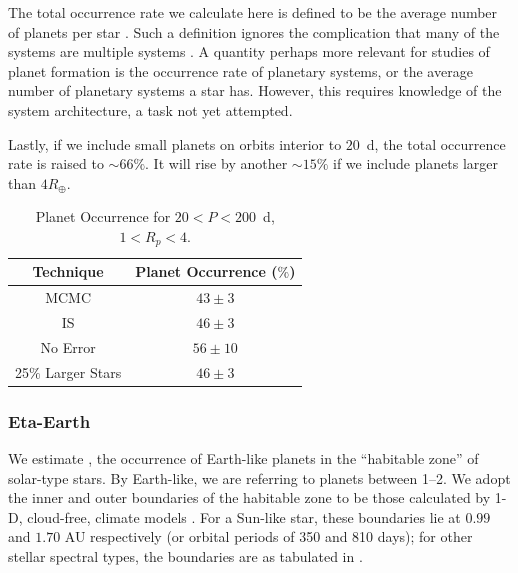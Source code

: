 The total occurrence rate we calculate here is defined to be the
average number of planets per star
\citep{Youdin,Fressin2013,Petigura2013}. Such a definition ignores
the complication that many of the \kep{} systems are multiple
systems \citep[e.g.][]{Lissauer2011}. A quantity perhaps more
relevant for studies of planet formation is the occurrence
rate of planetary systems, or the average number of planetary
systems a star has. However, this requires knowledge of the system
architecture, a task not yet attempted.  

Lastly, if we include small planets on orbits interior to $20$~d, the total
occurrence rate is raised to $\sim 66\%$. It will rise by another
$\sim 15\%$ if we include planets larger than $4 R_\oplus$.

\begin{table}[h]
\centering
\caption{Planet Occurrence for $20<P<200$~d, $1<R_p<4$\rearth{}.}
\begin{tabular}{c|c}\hline Technique & Planet Occurrence ($\%$)\\\hline
MCMC                   & $43 \pm 3$ \\
IS                     & $46 \pm 3$ \\
No Error               & $56 \pm 10$ \\
25$\%$ Larger Stars    & $46 \pm 3$ \\
\hline
\end{tabular}
\label{tab:occ}
\end{table}

\subsubsection{Eta-Earth}

We estimate \ee{}, the occurrence of Earth-like planets in the
``habitable zone'' of solar-type stars. By Earth-like, we are
referring to planets between 1--2\rearth{}.  We adopt the inner
and outer boundaries of the habitable zone to be those calculated by
1-D, cloud-free, climate models \citep{Kasting,Kopparapu2013a}.
For a Sun-like star, these boundaries lie at $0.99$ and $1.70$ AU respectively
(or orbital periods of 350 and 810 days); for other stellar spectral
types, the boundaries are as tabulated in \citet{Kopparapu2013a}.

